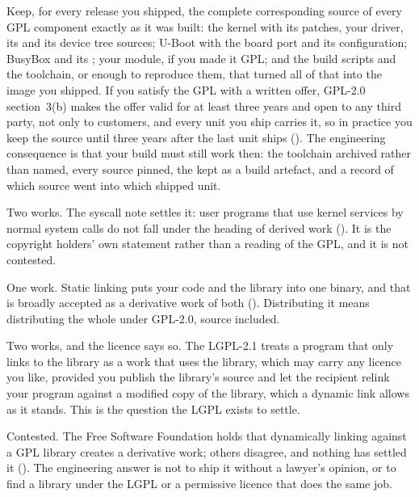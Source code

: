  Keep, for every release you shipped, the complete corresponding source of every GPL
component exactly as it was built: the kernel with its patches, your driver, its  and
its device tree sources; U-Boot with the board port and its configuration; BusyBox and its
; your module, if you made it GPL; and the build scripts and the toolchain, or enough
to reproduce them, that turned all of that into the image you shipped. If you satisfy the GPL with a
written offer, GPL-2.0 section~3(b) makes the offer valid for at least three years and open to any
third party, not only to customers, and every unit you ship carries it, so in practice you keep the
source until three years after the last unit ships (). The engineering consequence
is that your build must still work then: the toolchain archived rather than named, every source
pinned, the  kept as a build artefact, and a record of which source went into which
shipped unit.


 Two works. The syscall note settles it: user programs that use kernel services by normal
system calls do not fall under the heading of derived work (). It is the
copyright holders' own statement rather than a reading of the GPL, and it is not contested.

 One work. Static linking puts your code and the library into one binary, and that is
broadly accepted as a derivative work of both (). Distributing it means
distributing the whole under GPL-2.0, source included.

 Two works, and the licence says so. The LGPL-2.1 treats a program that only links to the
library as a work that uses the library, which may carry any licence you like, provided you publish
the library's source and let the recipient relink your program against a modified copy of the
library, which a dynamic link allows as it stands. This is the question the LGPL exists to settle.

 Contested. The Free Software Foundation holds that dynamically linking against a GPL
library creates a derivative work; others disagree, and nothing has settled it
(). The engineering answer is not to ship it without a lawyer's opinion, or to
find a library under the LGPL or a permissive licence that does the same job.

